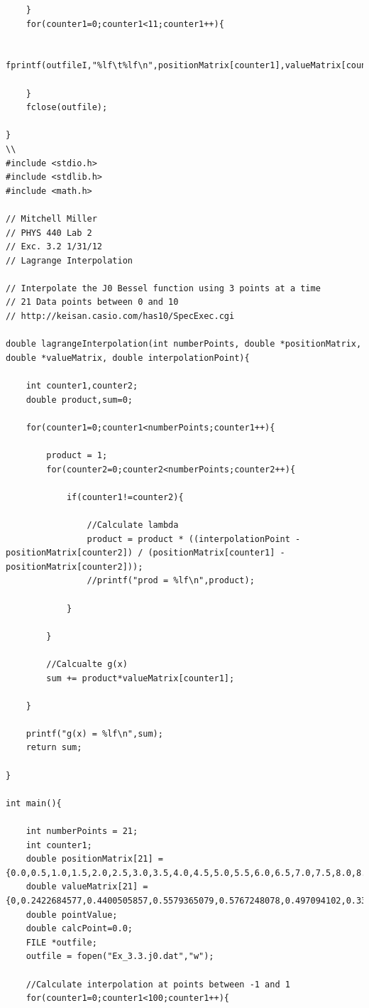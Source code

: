 \documentclass[12pt]{article}
\begin{document}
\begin{verbatim}
	}
	for(counter1=0;counter1<11;counter1++){
		
		fprintf(outfileI,"%lf\t%lf\n",positionMatrix[counter1],valueMatrix[counter1]);

	}
	fclose(outfile);

}
\\
#include <stdio.h>
#include <stdlib.h>
#include <math.h>

// Mitchell Miller
// PHYS 440 Lab 2
// Exc. 3.2 1/31/12
// Lagrange Interpolation

// Interpolate the J0 Bessel function using 3 points at a time
// 21 Data points between 0 and 10
// http://keisan.casio.com/has10/SpecExec.cgi

double lagrangeInterpolation(int numberPoints, double *positionMatrix, double *valueMatrix, double interpolationPoint){

	int counter1,counter2;
	double product,sum=0;

	for(counter1=0;counter1<numberPoints;counter1++){

		product = 1;
		for(counter2=0;counter2<numberPoints;counter2++){

			if(counter1!=counter2){

				//Calculate lambda
				product = product * ((interpolationPoint - positionMatrix[counter2]) / (positionMatrix[counter1] - positionMatrix[counter2]));
				//printf("prod = %lf\n",product);

			}
			
		}

		//Calcualte g(x)
		sum += product*valueMatrix[counter1];

	}

	printf("g(x) = %lf\n",sum);
	return sum;

}

int main(){

	int numberPoints = 21;
	int counter1;
	double positionMatrix[21] = {0.0,0.5,1.0,1.5,2.0,2.5,3.0,3.5,4.0,4.5,5.0,5.5,6.0,6.5,7.0,7.5,8.0,8.5,9.0,9.5,10.0};
	double valueMatrix[21] = {0,0.2422684577,0.4400505857,0.5579365079,0.5767248078,0.497094102,0.3390589585,0.1373775274,-0.06604332802,-0.2310604319,-0.3275791376,-0.3414382154,-0.2766838581,-0.1538413014,-0.0046828235,0.1352484276,0.2346363469,0.2731219637,0.2453117866,0.1612644308,0.04347274617};
	double pointValue;
	double calcPoint=0.0;
	FILE *outfile;
	outfile = fopen("Ex_3.3.j0.dat","w");

	//Calculate interpolation at points between -1 and 1
	for(counter1=0;counter1<100;counter1++){
		

\end{verbatim}
\end{document}
